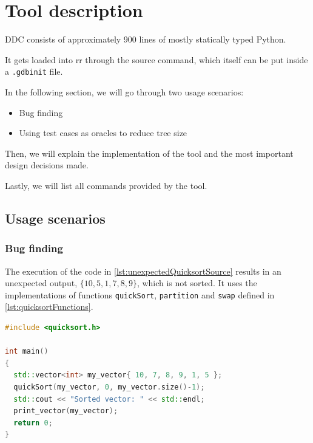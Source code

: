 \chapter{Tool description}
\label{cap:toolDescription}
DDC consists of approximately 900 lines of mostly statically typed Python.

It gets loaded into rr through the source command, which itself can be put inside a \verb|.gdbinit| file.

In the following section, we will go through two usage scenarios:
\begin{itemize}
    \item Bug finding
    \item Using test cases as oracles to reduce tree size
\end{itemize}

Then, we will explain the implementation of the tool and the most important design decisions made. 

Lastly, we will list all commands provided by the tool.
\section{Usage scenarios}
\subsection{Bug finding}
The execution of the code in \ref{lst:unexpectedQuicksortSource} results in an unexpected output, \(\{10, 5, 1, 7, 8, 9\}\), which is not sorted.
It uses the implementations of functions \verb|quickSort|, \verb|partition| and \verb|swap| defined in \ref{lst:quicksortFunctions}.
\begin{lstlisting}[language=C++, caption={Code that results in unexpected output}, frame=tb, label={lst:unexpectedQuicksortSource}]
#include <quicksort.h>

int main()
{
  std::vector<int> my_vector{ 10, 7, 8, 9, 1, 5 };
  quickSort(my_vector, 0, my_vector.size()-1);
  std::cout << "Sorted vector: " << std::endl;
  print_vector(my_vector);
  return 0;
}
\end{lstlisting}

